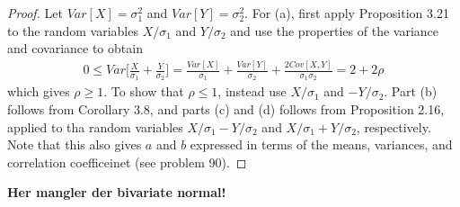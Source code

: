 \begin{proof}
  Let $Var[X] = \sigma_1^2$ and $Var[Y] = \sigma_2^2$. For (a), first apply Proposition 3.21 to the random variables $X/\sigma_1$ and $Y/\sigma_2$ and use the properties of the variance and covariance to obtain
  \begin{align*}
    0 \leq Var\bigg[ \frac{X}{\sigma_1} + \frac{Y}{\sigma_2} \bigg] = \frac{Var[X]}{\sigma_1} + \frac{Var[Y]}{\sigma_2} + \frac{2Cov[X, Y]}{\sigma_1\sigma_2} = 2 + 2\rho
  \end{align*}
  which gives $\rho\geq1$. To show that $\rho\leq1$, instead use $X/\sigma_1$ and $-Y/\sigma_2$. Part (b) follows from Corollary 3.8, and parts (c) and (d) follows from Proposition 2.16, applied to tha random variables $X/\sigma_1 - Y/\sigma_2$ and $X/\sigma_1 + Y/\sigma_2$, respectively. Note that this also gives $a$ and $b$ expressed in terms of the means, variances, and correlation coefficeinet (see problem 90).
\end{proof}

\textbf{Her mangler der bivariate normal!}
